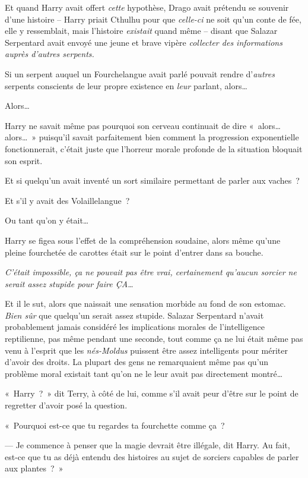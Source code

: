 Et quand Harry avait offert \emph{cette} hypothèse, Drago avait prétendu se souvenir d'une histoire -- Harry priait Cthulhu pour que \emph{celle-ci} ne soit qu'un conte de fée, elle y ressemblait, mais l'histoire \emph{existait} quand même -- disant que Salazar Serpentard avait envoyé une jeune et brave vipère \emph{collecter des informations auprès d'autres serpents.}

Si un serpent auquel un Fourchelangue avait parlé pouvait rendre d'\emph{autres} serpents conscients de leur propre existence en \emph{leur} parlant, alors…

Alors…

Harry ne savait même pas pourquoi son cerveau continuait de dire «~alors… alors…~»
puisqu'il savait parfaitement bien comment la progression exponentielle fonctionnerait, c'était juste que l'horreur morale profonde de la situation bloquait son esprit.

Et si quelqu'un avait inventé un sort similaire permettant de parler aux vaches~?

Et s'il y avait des Volaillelangue~?

Ou tant qu'on y était…

Harry se figea sous l'effet de la compréhension soudaine, alors même qu'une pleine fourchetée de carottes était sur le point d'entrer dans sa bouche.

\emph{C'était impossible, ça ne pouvait pas être vrai, certainement qu'aucun sorcier ne serait assez stupide pour faire ÇA…}

Et il le sut, alors que naissait une sensation morbide au fond de son estomac.
\emph{Bien sûr} que quelqu'un serait assez stupide.
Salazar Serpentard n'avait probablement jamais considéré les implications morales de l'intelligence reptilienne, pas même pendant une seconde, tout comme ça ne lui était même pas venu à l'esprit que les \emph{nés-Moldus} puissent être assez intelligents pour mériter d'avoir des droits.
La plupart des gens ne remarquaient même pas qu'un problème moral existait tant qu'on ne le leur avait pas directement montré…

«~Harry~?~»
dit Terry, à côté de lui, comme s'il avait peur d'être sur le point de regretter d'avoir posé la question.

«~Pourquoi est-ce que tu regardes ta fourchette comme ça~?

--- Je commence à penser que la magie devrait être illégale, dit Harry.
Au fait, est-ce que tu as déjà entendu des histoires au sujet de sorciers capables de parler aux plantes~?~»

